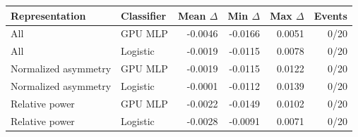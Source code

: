 \begin{tabular}{llrrrr}
\toprule
Representation & Classifier & Mean $\Delta$ & Min $\Delta$ & Max $\Delta$ & Events \\
\midrule
All & GPU MLP & -0.0046 & -0.0166 & 0.0051 & 0/20 \\
All & Logistic & -0.0019 & -0.0115 & 0.0078 & 0/20 \\
Normalized asymmetry & GPU MLP & -0.0019 & -0.0115 & 0.0122 & 0/20 \\
Normalized asymmetry & Logistic & -0.0001 & -0.0112 & 0.0139 & 0/20 \\
Relative power & GPU MLP & -0.0022 & -0.0149 & 0.0102 & 0/20 \\
Relative power & Logistic & -0.0028 & -0.0091 & 0.0071 & 0/20 \\
\bottomrule
\end{tabular}
